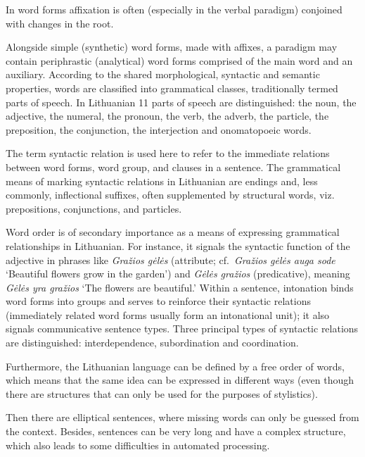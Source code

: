 \begin{multicols}{2}
    In word forms affixation is often (especially in the verbal paradigm) conjoined with changes in the root. 


Alongside simple (synthetic) word forms, made with affixes, a paradigm may contain periphrastic (analytical) word forms comprised of the main word and an auxiliary.
    According to the shared morphological, syntactic and semantic properties, words are classified into grammatical classes, traditionally termed parts of speech. In Lithuanian 11 parts of speech are distinguished: the noun, the adjective, the numeral, the pronoun, the verb, the adverb, the particle, the preposition, the conjunction, the interjection and onomatopoeic words.

    The term syntactic relation is used here to refer to the immediate relations between word forms, word group, and clauses in a sentence. The grammatical means of marking syntactic relations in Lithuanian are endings and, less commonly, inflectional suffixes, often supplemented by structural words, viz. prepositions, conjunctions, and particles. 
    
    Word order is of secondary importance as a means of expressing grammatical relationships in Lithuanian. For instance, it signals the syntactic function of the adjective in phrases like \textit{Gražios gėlės} (attribute; cf.~\textit{Gražios gėlės auga sode} `Beautiful flowers grow in the garden') and \textit{Gėlės gražios} (predicative), meaning \textit{Gėlės yra gražios} `The flowers are beautiful.' Within a sentence, intonation binds word forms into groups and serves to reinforce their syntactic relations (immediately related word forms usually form an intonational unit); it also signals communicative sentence types. Three principal types of syntactic relations are distinguished: interdependence, subordination and coordination.

    Furthermore, the Lithuanian language can be defined by a free order of words, which means that the same idea can be expressed in different ways (even though there are structures that can only be used for the purposes of stylistics).

Then there are elliptical sentences, where missing words can only be guessed from the context. Besides, sentences can be very long and have a complex structure, which also leads to some difficulties in automated processing.


\end{multicols}
